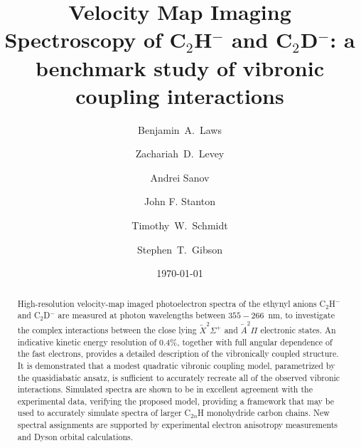 \documentclass[aip,graphicx]{revtex4-1}
\begin{document}

\title{Velocity Map Imaging Spectroscopy of C$_2$H$^-$ and C$_2$D$^-$: a benchmark study of vibronic coupling interactions}


\author{Benjamin~A.~Laws}
\author{Zachariah~D.~Levey} 
\author{Andrei Sanov}
\author{John F. Stanton}
\author{Timothy~W.~Schmidt} 
\author{Stephen~T.~Gibson}




\date{\today}

\begin{abstract}
High-resolution velocity-map imaged photoelectron spectra of the ethynyl anions C$_2$H$^-$ and C$_2$D$^-$ are measured at photon wavelengths between $355-266$~nm, to investigate the complex interactions between the close lying $\tilde{X} ^2\Sigma^+$ and $\tilde{A} ^2\Pi$ electronic states. An indicative kinetic energy resolution of 0.4\%, together with full angular dependence of the fast electrons, provides a detailed description of the vibronically coupled structure. It is demonstrated that a modest quadratic vibronic coupling model, parametrized by the quasidiabatic ansatz, is sufficient to accurately recreate all of the observed vibronic interactions. Simulated spectra are shown to be in excellent agreement with the experimental data, verifying the proposed model, providing a framework that may be used to accurately simulate spectra of larger C$_{2n}$H monohydride carbon chains. New spectral assignments are supported by experimental electron anisotropy measurements and Dyson orbital calculations.
\end{abstract}

\pacs{}
\end{document}
